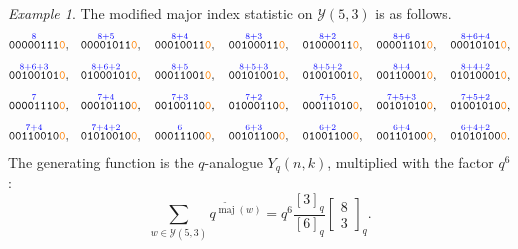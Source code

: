 \documentclass[11pt]{article}
\theoremstyle{definition}
\theoremstyle{remark}
\newtheorem{example}[theorem]{Example}
\theoremstyle{definition}
\numberwithin{equation}{section}
\begin{document}
\begin{example}
The modified major index statistic on $\mathcal{Y}(5,3)$ is as follows.
\[
\begin{aligned}
\overset{\textcolor{blue}{8}}{\texttt{00000111}}\textcolor{orange}{\texttt{0}},\quad 
&\overset{\textcolor{blue}{8+5}}{\texttt{00001011}}\textcolor{orange}{\texttt{0}},\quad 
\overset{\textcolor{blue}{8+4}}{\texttt{00010011}}\textcolor{orange}{\texttt{0}},\quad 
\overset{\textcolor{blue}{8+3}}{\texttt{00100011}}\textcolor{orange}{\texttt{0}},\quad 
\overset{\textcolor{blue}{8+2}}{\texttt{01000011}}\textcolor{orange}{\texttt{0}},\quad 
\overset{\textcolor{blue}{8+6}}{\texttt{00001101}}\textcolor{orange}{\texttt{0}},\quad 
\overset{\textcolor{blue}{8+6+4}}{\texttt{00010101}}\textcolor{orange}{\texttt{0}}, \\[1ex]
\overset{\textcolor{blue}{8+6+3}}{\texttt{00100101}}\textcolor{orange}{\texttt{0}},\quad 
&\overset{\textcolor{blue}{8+6+2}}{\texttt{01000101}}\textcolor{orange}{\texttt{0}},\quad 
\overset{\textcolor{blue}{8+5}}{\texttt{00011001}}\textcolor{orange}{\texttt{0}},\quad 
\overset{\textcolor{blue}{8+5+3}}{\texttt{00101001}}\textcolor{orange}{\texttt{0}},\quad 
\overset{\textcolor{blue}{8+5+2}}{\texttt{01001001}}\textcolor{orange}{\texttt{0}},\quad 
\overset{\textcolor{blue}{8+4}}{\texttt{00110001}}\textcolor{orange}{\texttt{0}},\quad 
\overset{\textcolor{blue}{8+4+2}}{\texttt{01010001}}\textcolor{orange}{\texttt{0}}, \\[1ex]
\overset{\textcolor{blue}{7}}{\texttt{00001110}}\textcolor{orange}{\texttt{0}},\quad 
&\overset{\textcolor{blue}{7+4}}{\texttt{00010110}}\textcolor{orange}{\texttt{0}},\quad 
\overset{\textcolor{blue}{7+3}}{\texttt{00100110}}\textcolor{orange}{\texttt{0}},\quad 
\overset{\textcolor{blue}{7+2}}{\texttt{01000110}}\textcolor{orange}{\texttt{0}},\quad 
\overset{\textcolor{blue}{7+5}}{\texttt{00011010}}\textcolor{orange}{\texttt{0}},\quad 
\overset{\textcolor{blue}{7+5+3}}{\texttt{00101010}}\textcolor{orange}{\texttt{0}},\quad 
\overset{\textcolor{blue}{7+5+2}}{\texttt{01001010}}\textcolor{orange}{\texttt{0}}, \\[1ex]
\overset{\textcolor{blue}{7+4}}{\texttt{00110010}}\textcolor{orange}{\texttt{0}},\quad 
&\overset{\textcolor{blue}{7+4+2}}{\texttt{01010010}}\textcolor{orange}{\texttt{0}},\quad 
\overset{\textcolor{blue}{6}}{\texttt{00011100}}\textcolor{orange}{\texttt{0}},\quad 
\overset{\textcolor{blue}{6+3}}{\texttt{00101100}}\textcolor{orange}{\texttt{0}},\quad 
\overset{\textcolor{blue}{6+2}}{\texttt{01001100}}\textcolor{orange}{\texttt{0}},\quad 
\overset{\textcolor{blue}{6+4}}{\texttt{00110100}}\textcolor{orange}{\texttt{0}},\quad 
\overset{\textcolor{blue}{6+4+2}}{\texttt{01010100}}\textcolor{orange}{\texttt{0}}.
\end{aligned}
\]
The generating function is the \(q\)-analogue \(Y_q(n,k)\), multiplied
with the factor \(q^6\):
\[
\sum_{w\in\mathcal{Y}(5,3)}q^{\widetilde{\operatorname{maj}}(w)} =  q^6\frac{[3]_q}{[6]_q}\begin{bmatrix} 8 \\ 3 \end{bmatrix}_q.
\]
\end{example}
\end{document}
